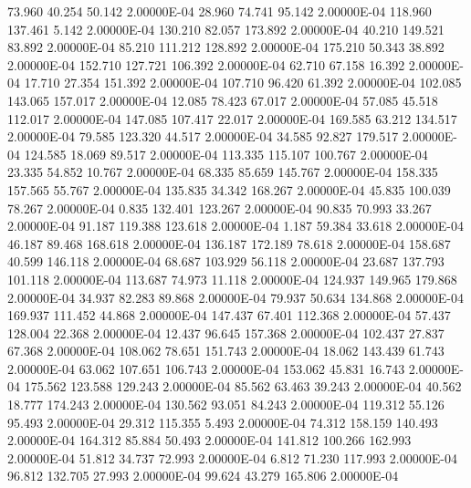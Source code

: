     73.960    40.254    50.142  2.00000E-04
    28.960    74.741    95.142  2.00000E-04
   118.960   137.461     5.142  2.00000E-04
   130.210    82.057   173.892  2.00000E-04
    40.210   149.521    83.892  2.00000E-04
    85.210   111.212   128.892  2.00000E-04
   175.210    50.343    38.892  2.00000E-04
   152.710   127.721   106.392  2.00000E-04
    62.710    67.158    16.392  2.00000E-04
    17.710    27.354   151.392  2.00000E-04
   107.710    96.420    61.392  2.00000E-04
   102.085   143.065   157.017  2.00000E-04
    12.085    78.423    67.017  2.00000E-04
    57.085    45.518   112.017  2.00000E-04
   147.085   107.417    22.017  2.00000E-04
   169.585    63.212   134.517  2.00000E-04
    79.585   123.320    44.517  2.00000E-04
    34.585    92.827   179.517  2.00000E-04
   124.585    18.069    89.517  2.00000E-04
   113.335   115.107   100.767  2.00000E-04
    23.335    54.852    10.767  2.00000E-04
    68.335    85.659   145.767  2.00000E-04
   158.335   157.565    55.767  2.00000E-04
   135.835    34.342   168.267  2.00000E-04
    45.835   100.039    78.267  2.00000E-04
     0.835   132.401   123.267  2.00000E-04
    90.835    70.993    33.267  2.00000E-04
    91.187   119.388   123.618  2.00000E-04
     1.187    59.384    33.618  2.00000E-04
    46.187    89.468   168.618  2.00000E-04
   136.187   172.189    78.618  2.00000E-04
   158.687    40.599   146.118  2.00000E-04
    68.687   103.929    56.118  2.00000E-04
    23.687   137.793   101.118  2.00000E-04
   113.687    74.973    11.118  2.00000E-04
   124.937   149.965   179.868  2.00000E-04
    34.937    82.283    89.868  2.00000E-04
    79.937    50.634   134.868  2.00000E-04
   169.937   111.452    44.868  2.00000E-04
   147.437    67.401   112.368  2.00000E-04
    57.437   128.004    22.368  2.00000E-04
    12.437    96.645   157.368  2.00000E-04
   102.437    27.837    67.368  2.00000E-04
   108.062    78.651   151.743  2.00000E-04
    18.062   143.439    61.743  2.00000E-04
    63.062   107.651   106.743  2.00000E-04
   153.062    45.831    16.743  2.00000E-04
   175.562   123.588   129.243  2.00000E-04
    85.562    63.463    39.243  2.00000E-04
    40.562    18.777   174.243  2.00000E-04
   130.562    93.051    84.243  2.00000E-04
   119.312    55.126    95.493  2.00000E-04
    29.312   115.355     5.493  2.00000E-04
    74.312   158.159   140.493  2.00000E-04
   164.312    85.884    50.493  2.00000E-04
   141.812   100.266   162.993  2.00000E-04
    51.812    34.737    72.993  2.00000E-04
     6.812    71.230   117.993  2.00000E-04
    96.812   132.705    27.993  2.00000E-04
    99.624    43.279   165.806  2.00000E-04
